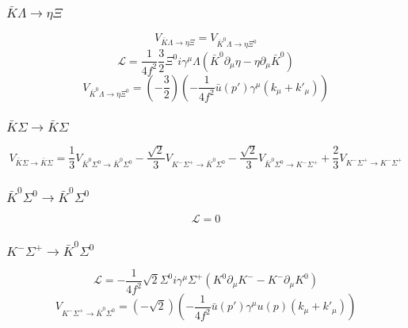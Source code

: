 \subsubsection{$\bar{K}\Lambda\rightarrow\eta\Xi$}
\begin{equation}
	V_{\bar{K}\Lambda\rightarrow\eta\Xi}=V_{\bar{K}^{0}\Lambda\rightarrow\eta\Xi^{0}}
\end{equation}
\begin{equation}
	\mathcal{L}=\frac{1}{4f^2}\frac{3}{2}\Xi^{0}i\gamma^{\mu}\Lambda(\bar{K}^{0}\partial_{\mu}\eta-\eta\partial_{\mu}\bar{K}^{0})
\end{equation}
\begin{equation}
	V_{\bar{K}^{0}\Lambda\rightarrow\eta\Xi^{0}}=\left(-\frac{3}{2}\right)\left(-\frac{1}{4f^2}\bar{u}(p')\gamma^{\mu}(k_{\mu}+k'_{\mu})\right)
\end{equation}
\subsubsection{$\bar{K}\Sigma\rightarrow \bar{K}\Sigma$}
\begin{equation}
	V_{\bar{K}\Sigma\rightarrow \bar{K}\Sigma}=\frac{1}{3}V_{\bar{K}^{0}\Sigma^{0}\rightarrow \bar{K}^{0}\Sigma^{0}}-\frac{\sqrt{2}}{3}V_{K^{-}\Sigma^{+}\rightarrow \bar{K}^{0}\Sigma^{0}}-\frac{\sqrt{2}}{3}V_{\bar{K}^{0}\Sigma^{0}\rightarrow K^{-}\Sigma^{+}}+\frac{2}{3}V_{K^{-}\Sigma^{+}\rightarrow K^{-}\Sigma^{+}}
\end{equation}
\subsubsection{$\bar{K}^{0}\Sigma^{0}\rightarrow \bar{K}^{0}\Sigma^{0}$}
\begin{equation}
	\mathcal{L}=0
\end{equation}
\subsubsection{$K^{-}\Sigma^{+}\rightarrow \bar{K}^{0}\Sigma^{0}$}
\begin{equation}
	\mathcal{L}=-\frac{1}{4f^2}\sqrt{2}\Sigma^{0}i\gamma^{\mu}\Sigma^{+}(K^{0}\partial_{\mu}K^{-}-K^{-}\partial_{\mu}K^{0})
\end{equation}
\begin{equation}
	V_{K^{-}\Sigma^{+}\rightarrow \bar{K}^{0}\Sigma^{0}}=\left(-\sqrt{2}\right)\left(-\frac{1}{4f^2}\bar{u}(p')\gamma^{\mu}u(p)(k_{\mu}+k'_{\mu})\right)
\end{equation}
